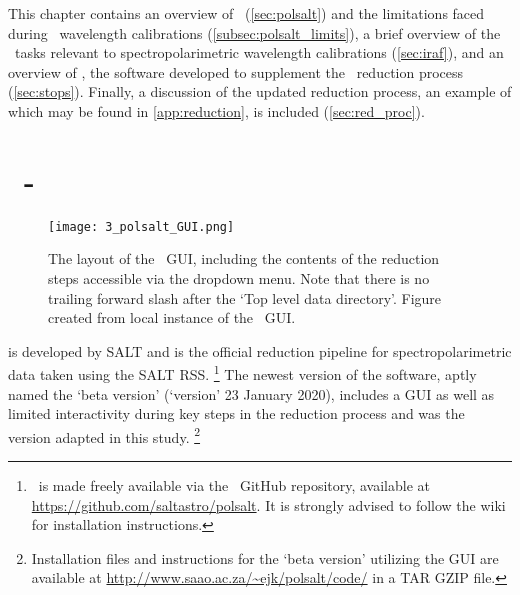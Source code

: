 
This chapter contains an overview of \polsalt\ (\autoref{sec:polsalt}) and the limitations faced during \polsalt\ wavelength calibrations (\autoref{subsec:polsalt_limits}), a brief overview of the \iraf\ tasks relevant to spectropolarimetric wavelength calibrations (\autoref{sec:iraf}), and an overview of \stops, the software developed to supplement the \polsalt\ reduction process (\autoref{sec:stops}). Finally, a discussion of the updated reduction process, an example of which may be found in \autoref{app:reduction}, is included (\autoref{sec:red_proc}).

\section[\textsc{polsalt}]{\polsalt\ - } \label{sec:polsalt}

\begin{figure}[t]
    \centering
    \texttt{[image: 3\_polsalt\_GUI.png]}
    \caption{The layout of the \polsalt\ \gls{GUI}, including the contents of the reduction steps accessible via the dropdown menu. Note that there is no trailing forward slash after the `Top level data directory'. Figure created from local instance of the \polsalt\ \gls{GUI}.}
    \label{fig:polsalt_gui}
\end{figure}

 is developed by \gls{SALT} and is the official reduction pipeline for spectropolarimetric data taken using the \gls{SALT} \gls{RSS}.%
\footnote{\polsalt\ is made freely available via the \polsalt\ GitHub repository, available at \url{https://github.com/saltastro/polsalt}. It is strongly advised to follow the wiki for installation instructions.}
The newest version of the software, aptly named the `beta version' (`version' 23 January 2020), includes a \gls{GUI} as well as limited interactivity during key steps in the reduction process and was the version adapted in this study.%
\footnote{Installation files and instructions for the `beta version' utilizing the \gls{GUI} are available at \url{http://www.saao.ac.za/~ejk/polsalt/code/} in a TAR GZIP file.}

